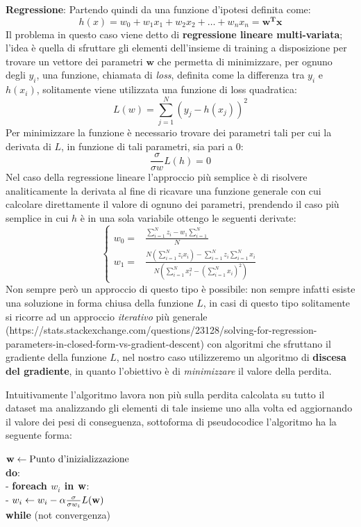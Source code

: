 \documentclass[../../main.tex]{subfiles}
\begin{document}
    \textbf{Regressione}: Partendo quindi da una funzione d'ipotesi definita come:
    \[h(x) = w_0 + w_1x_1 + w_2x_2 + \dots + w_nx_n = \bm{w^T x}\]
    Il problema in questo caso viene detto di \textbf{regressione lineare multi-variata}; l'idea è quella di sfruttare gli elementi dell'insieme di training a disposizione per trovare un vettore dei parametri $\bm{w}$ che permetta di minimizzare, per ognuno degli $y_i$, una funzione, chiamata di \textit{loss}, definita come la differenza tra $y_i$ e $h(x_i)$, solitamente viene utilizzata una funzione di loss quadratica:
    \[L(w) = \sum_{j=1}^N(y_j - h(x_j))^2\]
    Per minimizzare la funzione è necessario trovare dei parametri tali per cui la derivata di $L$, in funzione di tali parametri, sia pari a 0:
    \[\frac{\sigma}{\sigma w} L(h) = 0\]
    Nel caso della regressione lineare l'approccio più semplice è di risolvere analiticamente la derivata al fine di ricavare una funzione generale con cui calcolare direttamente il valore di ognuno dei parametri, prendendo il caso più semplice in cui $h$ è in una sola variabile ottengo le seguenti derivate:
    \[
    \begin{cases}
        w_0 = & \frac{\sum_{i=1}^N z_i - w_1 \sum_{i=1}^N}{N}\\
        w_1 = & \frac{N(\sum_{i=1}^N z_ix_i) - \sum_{i=1}^N z_i \sum_{i=1}^N x_i}{N(\sum_{i=1}^N x_i^2 - (\sum_{i=1}^N x_i)^2)} 
    \end{cases}    
    \]
    Non sempre però un approccio di questo tipo è possibile: non sempre infatti esiste una soluzione in forma chiusa della funzione $L$, in casi di questo tipo solitamente si ricorre ad un approccio \textit{iterativo} più generale (https://stats.stackexchange.com/questions/23128/solving-for-regression-parameters-in-closed-form-vs-gradient-descent) con algoritmi che sfruttano il gradiente della funzione $L$, nel nostro caso utilizzeremo un algoritmo di \textbf{discesa del gradiente}, in quanto l'obiettivo è di \textit{minimizzare} il valore della perdita.

    Intuitivamente l'algoritmo lavora non più sulla perdita calcolata su tutto il dataset ma analizzando gli elementi di tale insieme uno alla volta ed aggiornando il valore dei pesi di conseguenza, sottoforma di pseudocodice l'algoritmo ha la seguente forma:

    $\bf{w} \leftarrow \text{Punto d'inizializzazione}$\\
    \textbf{do}:\\
    - \quad \textbf{foreach $w_i$ in $\bf{w}$}:\\
    - \quad \quad $w_i \leftarrow w_i - \alpha \frac{\sigma}{\sigma w_i} L(\bf{w})$\\
    \textbf{while} (not convergenza)
\end{document}
